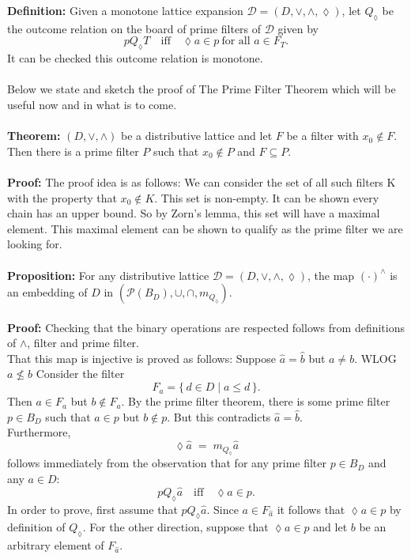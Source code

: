 \documentclass[12pt]{article}
\begin{document}
\textbf{Definition:}  
Given a monotone lattice expansion $\mathcal{D} = (D, \vee, \wedge, \lozenge)$,  
let $Q_{\lozenge}$ be the outcome relation on the board of prime filters of $\mathcal{D}$ given by
\[
p Q_{\lozenge} T \quad \text{iff} \quad \lozenge a \in p \ \text{for all } a \in F_{T}.
\]
It can be checked this outcome relation is monotone. \\ \\
Below we state and sketch the proof of The Prime Filter Theorem which will be useful now and in what is to come. \\ \\
\textbf{Theorem:} $(D,\vee,\wedge)$ be a distributive lattice and let $F$ be a filter with $x_0\notin F$. 
Then there is a prime filter $P$ such that $x_0\notin P$ and $F\subseteq P$.\\ \\
\textbf{Proof:} The proof idea is as follows: We can consider the set of all such filters K with the property that $x_0 \notin K $. This set is non-empty. It can be shown every chain has an upper bound. So by Zorn's lemma, this set will have a maximal element. This maximal element can be shown to qualify as the prime filter we are looking for. \\ \\
\textbf{Proposition:} For any distributive lattice $\mathcal{D}=(D, \vee, \wedge, \lozenge)$, the map $(\cdot)^{\wedge}$ is an embedding of $D$ in 
$(\mathcal{P}(B_D), \cup, \cap,m_{Q_{\lozenge}})$. \\ \\
\textbf{Proof:} Checking that the binary operations are respected follows from definitions of $\wedge$, filter and prime filter. \\
That this map is injective is proved as follows:  
Suppose $\widehat{a} = \widehat{b}$ but $a \neq b$. WLOG $a \nleq b$
Consider the filter 
\[
F_{a} = \{\, d \in D \mid a \leq d \,\}.
\]
Then $a \in F_{a}$ but $b \notin F_{a}$.  
By the prime filter theorem, there is some prime filter $p \in B_{D}$ such that  
$a \in p$ but $b \notin p$.  
But this contradicts $\widehat{a} = \widehat{b}$. \\
Furthermore, 
\[
\lozenge \widehat{a} \;=\; m_{Q_{\lozenge}} \widehat{a}
\]
follows immediately from the observation that for any prime filter $p \in B_{D}$ and any $a \in D$:  
\[
p Q_{\lozenge} \widehat{a} \quad \text{iff} \quad \lozenge a \in p.
\]
In order to prove, first assume that $p Q_{\lozenge} \widehat{a}$.  
Since $a \in F_{\widehat{a}}$ it follows that $\lozenge a \in p$ by definition of $Q_{\lozenge}$. For the other direction, suppose that $\lozenge a \in p$ and let $b$ be an arbitrary element of $F_{\widehat{a}}$.  
\end{document}
